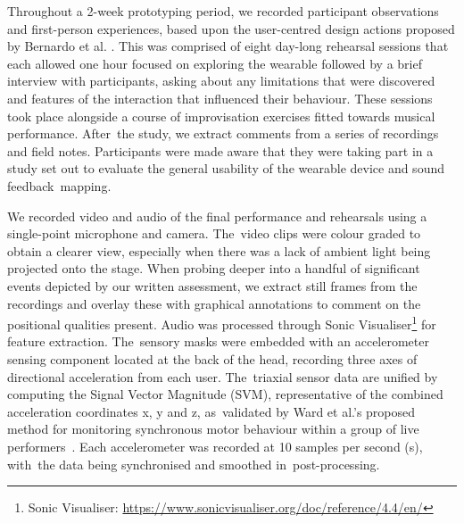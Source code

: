 Throughout a 2-week prototyping period, we recorded participant observations and first-person experiences, based upon the user-centred design actions proposed by Bernardo et al. \cite{bernardo_user-centred_2018}. This was comprised of eight day-long rehearsal sessions that each allowed one hour focused on exploring the wearable followed by a brief interview with participants, asking about any limitations that were discovered and features of the interaction that influenced their behaviour. These sessions took place alongside a course of improvisation exercises fitted towards musical performance. After~the study, we extract comments from a series of recordings and field notes. Participants were made aware that they were taking part in a study set out to evaluate the general usability of the wearable device and sound feedback~mapping.

We recorded video and audio of the final performance and rehearsals using a single-point microphone and camera. The~video clips were colour graded to obtain a clearer view, especially when there was a lack of ambient light being projected onto the stage. When probing deeper into a handful of significant events depicted by our written assessment, we extract still frames from the recordings and overlay these with graphical annotations to comment on the positional qualities present. Audio was processed through Sonic Visualiser\footnote{Sonic Visualiser: \url{https://www.sonicvisualiser.org/doc/reference/4.4/en/}} for feature extraction. The~sensory masks were embedded with an accelerometer sensing component located at the back of the head, recording three axes of directional acceleration from each user. The~triaxial sensor data are unified by computing the Signal Vector Magnitude (SVM), representative of the combined acceleration coordinates x, y and z, as~validated by Ward et al.'s %
proposed method for monitoring synchronous motor behaviour within a group of live performers~\cite{ward_sensing_2018}. Each accelerometer was recorded at 10 samples per second (s), with~the data being synchronised and smoothed in~post-processing.

